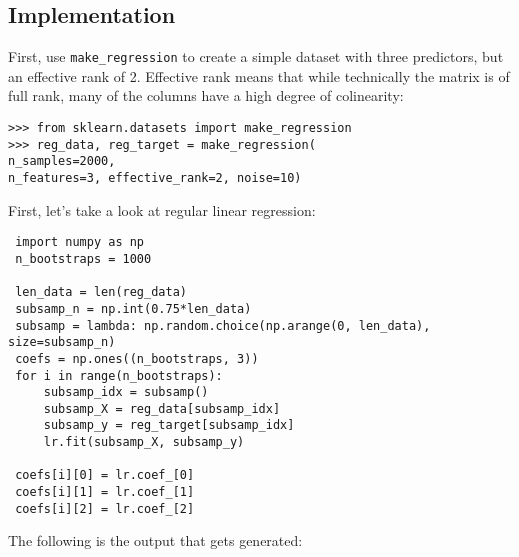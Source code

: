 \documentclass[SKL-MASTER.tex]{subfiles}
\begin{document}
\subsection*{Implementation} %
First, use \texttt{make\_regression} to create a simple dataset with three predictors, but an
effective rank of 2. Effective rank means that while technically the matrix is of full rank,
many of the columns have a high degree of colinearity:
\begin{framed}
\begin{verbatim}
>>> from sklearn.datasets import make_regression
>>> reg_data, reg_target = make_regression(
n_samples=2000,
n_features=3, effective_rank=2, noise=10)
\end{verbatim}
\end{framed}

First, let's take a look at regular linear regression:
\begin{framed}
	\begin{verbatim}
 import numpy as np
 n_bootstraps = 1000
 
 len_data = len(reg_data)
 subsamp_n = np.int(0.75*len_data)
 subsamp = lambda: np.random.choice(np.arange(0, len_data), size=subsamp_n)
 coefs = np.ones((n_bootstraps, 3))
 for i in range(n_bootstraps):
     subsamp_idx = subsamp()
     subsamp_X = reg_data[subsamp_idx]
     subsamp_y = reg_target[subsamp_idx]
     lr.fit(subsamp_X, subsamp_y)
     
 coefs[i][0] = lr.coef_[0]
 coefs[i][1] = lr.coef_[1]
 coefs[i][2] = lr.coef_[2]
\end{verbatim}
\end{framed}


The following is the output that gets generated:
\end{document}
